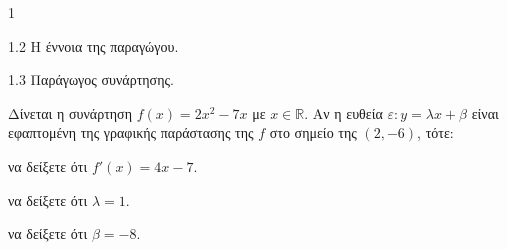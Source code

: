 \begin{ylh}{1}
    \item 1.2 Η έννοια της παραγώγου.
    \item 1.3 Παράγωγος συνάρτησης.
\end{ylh}
Δίνεται η συνάρτηση $f(x)=2x^2-7x$ με $x\in\mathbb{R}$. Αν η ευθεία $\varepsilon: y = \lambda x + \beta$ είναι εφαπτομένη της γραφικής παράστασης της $f$ στο σημείο της $(2, -6)$, τότε:
\begin{alist}
    \item να δείξετε ότι $f'(x)=4x-7$. 
    \item να δείξετε ότι $\lambda = 1$. 
    \item να δείξετε ότι $\beta = -8$. 
\end{alist}


